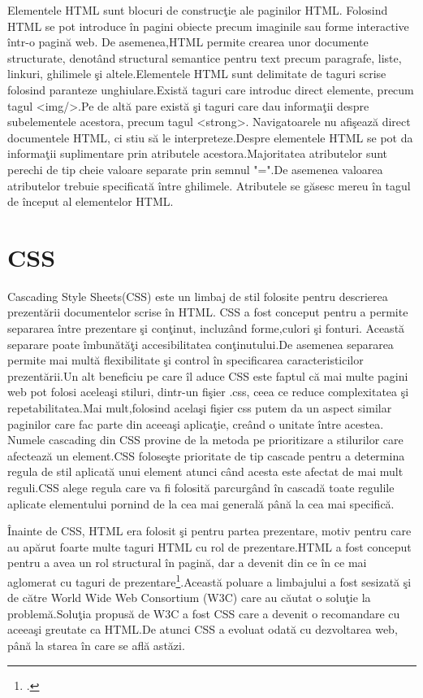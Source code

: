 \documentclass[a4paper,12pt]{report}
\begin{document}
Elementele HTML sunt blocuri de construc\c tie ale paginilor HTML. Folosind HTML se pot introduce \^in pagini obiecte precum imaginile
sau forme interactive \^intr-o pagin\u a web. De asemenea,HTML permite crearea unor documente structurate, denot\^and
structural semantice pentru text precum paragrafe, liste, linkuri, ghilimele \c si altele.Elementele HTML sunt delimitate de taguri
scrise folosind paranteze unghiulare.Exist\u a taguri care introduc direct elemente, precum tagul <img/>.Pe de alt\u a
pare exist\u a \c si taguri care dau informa\c tii despre subelementele acestora, precum tagul <strong>.
Navigatoarele nu afi\c seaz\u a direct documentele HTML, ci stiu s\u a le interpreteze.Despre elementele 
HTML se pot da informa\c tii suplimentare prin atributele acestora.Majoritatea atributelor sunt perechi
de tip cheie valoare separate prin semnul "=".De asemenea valoarea atributelor trebuie specificat\u a \^intre ghilimele.
Atributele se g\u asesc mereu \^in tagul de \^inceput al elementelor HTML.

\section{CSS}

Cascading Style Sheets(CSS) este un limbaj de stil folosite pentru descrierea prezent\u arii documentelor scrise \^in HTML.
CSS a fost conceput pentru a permite separarea \^intre prezentare \c si con\c tinut, incluz\^and forme,culori \c si fonturi.
Aceast\u a separare poate \^imbun\u at\u a\c ti accesibilitatea con\c tinutului.De asemenea separarea permite mai mult\u a 
flexibilitate \c si control \^in specificarea caracteristicilor prezent\u arii.Un alt beneficiu pe care \^il aduce CSS este 
faptul c\u a mai multe pagini web pot folosi acelea\c si stiluri, dintr-un fi\c sier .css, ceea ce reduce complexitatea
\c si repetabilitatea.Mai mult,folosind acela\c si fi\c sier css putem  da un aspect similar paginilor care fac parte din 
aceea\c si aplica\c tie, cre\^and o unitate \^intre acestea. Numele cascading din CSS provine de la metoda pe prioritizare 
a stilurilor care afecteaz\u a un element.CSS folose\c ste prioritate de tip cascade pentru a determina regula de stil aplicat\u a 
unui element atunci c\^and acesta este afectat de mai mult reguli.CSS alege regula care va fi folosit\u a parcurg\^and \^in cascad\u a toate
regulile aplicate elementului pornind de la cea mai general\u a p\^an\u a la cea mai specific\u a. 

\^Inainte de CSS, HTML era folosit \c si pentru partea prezentare, motiv pentru care au ap\u arut foarte multe taguri HTML
cu rol de prezentare.HTML a fost conceput pentru a avea un rol structural \^in pagin\u a, dar a devenit din ce \^in ce mai 
aglomerat cu taguri de prezentare\footcite{cssDef}.Aceast\u a poluare a limbajului a fost sesizat\u a \c si de c\u atre World Wide Web Consortium (W3C)
care au c\u autat o solu\c tie la problem\u a.Solu\c tia propus\u a de W3C a fost CSS care a devenit o recomandare cu aceea\c si greutate
ca HTML.De atunci CSS a evoluat odat\u a cu dezvoltarea web, p\^an\u a la starea \^in care se afl\u a ast\u azi.
\end{document}
